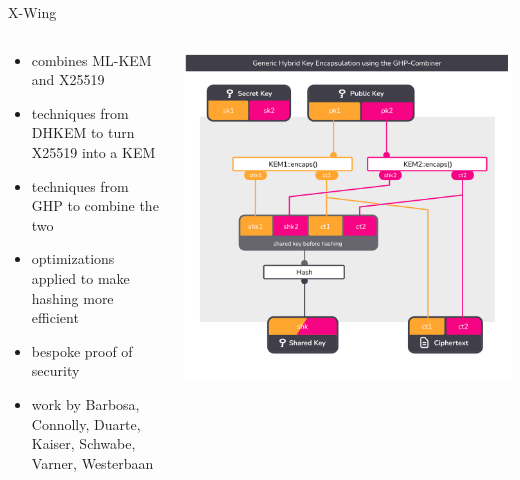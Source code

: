 \begin{frame}{X-Wing \citeXwing}
  \begin{columns}[c]
    \begin{column}{.4\linewidth}
      \small
      \begin{itemize}
        \item combines ML-KEM and X25519
        \item techniques from DHKEM to turn X25519 into a KEM
        \item techniques from GHP to combine the two
        \item optimizations applied to make hashing more efficient
        \item bespoke proof of security
        \item work by Barbosa, Connolly, Duarte, Kaiser, Schwabe, Varner, Westerbaan
      \end{itemize}
    \end{column}
    \begin{column}{.55\linewidth}
      \includegraphics[width=\linewidth,page=3,clip=true,trim={29 43  29 58}]{graphics/rosenpass-encapsulation-combiner.pdf}
    \end{column}

  \end{columns}
\end{frame}

